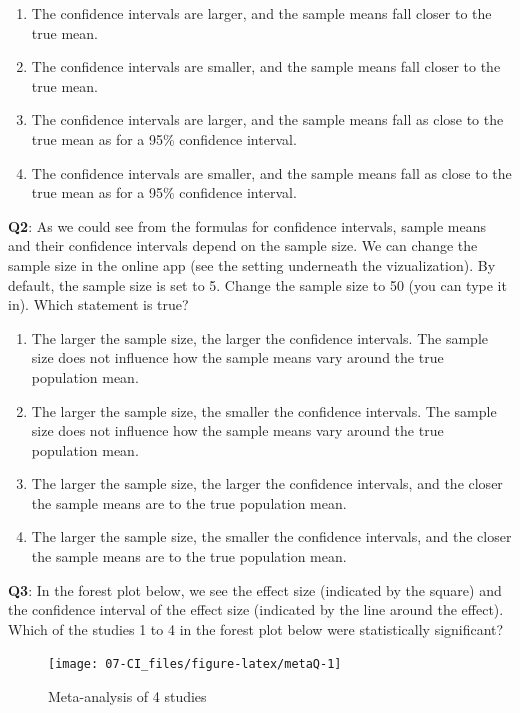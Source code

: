 \documentclass[
  oneside]{book}
\providecommand{\tightlist}{%
  \setlength{\itemsep}{0pt}\setlength{\parskip}{0pt}}
\begin{document}
\begin{enumerate}
\def\labelenumi{\Alph{enumi})}
\tightlist
\item
  The confidence intervals are larger, and the sample means fall closer to the true mean.
\item
  The confidence intervals are smaller, and the sample means fall closer to the true mean.
\item
  The confidence intervals are larger, and the sample means fall as close to the true mean as for a 95\% confidence interval.
\item
  The confidence intervals are smaller, and the sample means fall as close to the true mean as for a 95\% confidence interval.
\end{enumerate}

\textbf{Q2}: As we could see from the formulas for confidence intervals, sample means and their confidence intervals depend on the sample size. We can change the sample size in the online app (see the setting underneath the vizualization). By default, the sample size is set to 5. Change the sample size to 50 (you can type it in). Which statement is true?

\begin{enumerate}
\def\labelenumi{\Alph{enumi})}
\tightlist
\item
  The larger the sample size, the larger the confidence intervals. The sample size does not influence how the sample means vary around the true population mean.
\item
  The larger the sample size, the smaller the confidence intervals. The sample size does not influence how the sample means vary around the true population mean.
\item
  The larger the sample size, the larger the confidence intervals, and the closer the sample means are to the true population mean.
\item
  The larger the sample size, the smaller the confidence intervals, and the closer the sample means are to the true population mean.
\end{enumerate}

\textbf{Q3}: In the forest plot below, we see the effect size (indicated by the square) and the confidence interval of the effect size (indicated by the line around the effect). Which of the studies 1 to 4 in the forest plot below were statistically significant?



\begin{figure}

{\centering \texttt{[image: 07-CI\_files/figure-latex/metaQ-1]} 

}

\caption{Meta-analysis of 4 studies}\label{fig:metaQ}
\end{figure}
\end{document}
